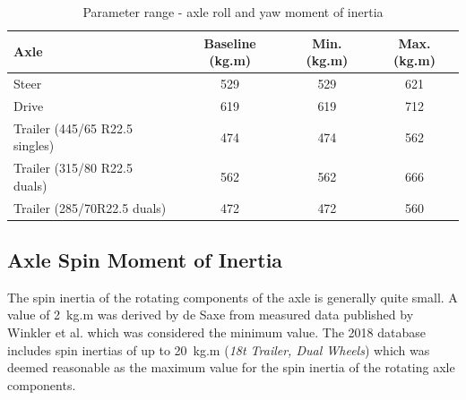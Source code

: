\begin{table}[H]
	\centering\footnotesize
	\begin{threeparttable}

		\begin{tabulary}{\textwidth}{lccc}
			\toprule
			\textbf{Axle} & \textbf{Baseline (kg.m\sstw)} & \textbf{Min. (kg.m\sstw)} & \textbf{Max. (kg.m\sstw)} \\
			\midrule
             Steer & 529   & 529   & 621 \\
             Drive & 619   & 619   & 712 \\
             Trailer (445/65 R22.5 singles)  & 474   & 474   & 562 \\
             Trailer (315/80 R22.5 duals) & 562   & 562   & 666 \\
             Trailer (285/70R22.5 duals) & 472   & 472   & 560 \\
			\bottomrule
		\end{tabulary}

		\caption{Parameter range - axle roll and yaw moment of inertia}
		\label{table:parameter-range-axle-roll-and-yaw-inertia}


	\end{threeparttable}
\end{table}

\subsection{Axle Spin Moment of Inertia}\label{section:pr-axle-spin-moment-of-inertia}

The spin inertia of the rotating components of the axle is generally quite small. A value of 2~kg.m\sstw{} was derived by de Saxe \cite{DeSaxe2012} from measured data published by Winkler et al. \cite{Winkler1995} which was considered the minimum value. The \trucksim{} 2018 database includes spin inertias of up to 20~kg.m\sstw{} (\textit{18t Trailer, Dual Wheels}) which was deemed reasonable as the maximum value for the spin inertia of the rotating axle components.

